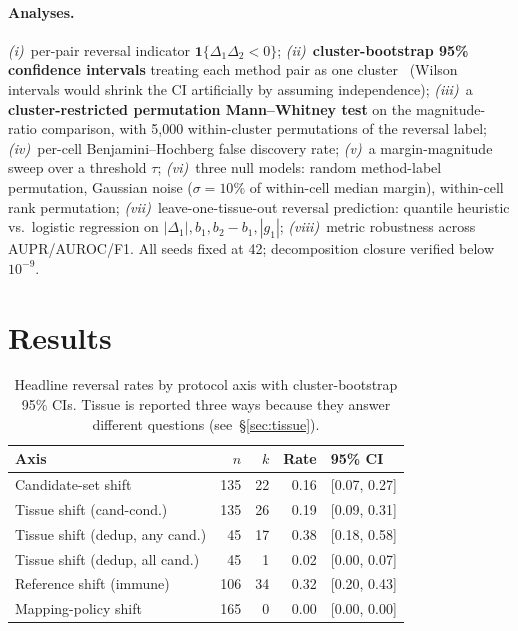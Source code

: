 \documentclass[sigconf,anonymous]{acmart}
\begin{document}
\paragraph{Analyses.}
\emph{(i)}~per-pair reversal indicator $\mathbf{1}\{\Delta_1\Delta_2 < 0\}$;
\emph{(ii)}~\textbf{cluster-bootstrap 95\% confidence intervals} treating
each method pair as one cluster~\cite{cameron2015} (Wilson intervals would
shrink the CI artificially by assuming independence);
\emph{(iii)}~a \textbf{cluster-restricted permutation Mann--Whitney test}
on the magnitude-ratio comparison, with 5{,}000 within-cluster
permutations of the reversal label;
\emph{(iv)}~per-cell Benjamini--Hochberg false discovery rate;
\emph{(v)}~a margin-magnitude sweep over a threshold $\tau$;
\emph{(vi)}~three null models: random method-label permutation, Gaussian
noise ($\sigma = 10\%$ of within-cell median margin), within-cell rank
permutation;
\emph{(vii)}~leave-one-tissue-out reversal prediction: quantile heuristic
vs.\ logistic regression on $|\Delta_1|, b_1, b_2{-}b_1, |g_1|$;
\emph{(viii)}~metric robustness across AUPR/AUROC/F1.
All seeds fixed at 42; decomposition closure verified below $10^{-9}$.

\section{Results}
\label{sec:results}

\begin{table}[t]
\centering
\caption{Headline reversal rates by protocol axis with cluster-bootstrap 95\% CIs.
Tissue is reported three ways because they answer different questions
(see~\S\ref{sec:tissue}).}
\label{tab:headline}
\small
\setlength{\tabcolsep}{4pt}
\begin{tabular}{lrrrl}
\toprule
Axis & $n$ & $k$ & Rate & 95\% CI \\
\midrule
Candidate-set shift            & 135 & 22 & 0.16 & [0.07, 0.27] \\
Tissue shift (cand-cond.)      & 135 & 26 & 0.19 & [0.09, 0.31] \\
Tissue shift (dedup, any cand.)&  45 & 17 & 0.38 & [0.18, 0.58] \\
Tissue shift (dedup, all cand.)&  45 &  1 & 0.02 & [0.00, 0.07] \\
Reference shift (immune)       & 106 & 34 & 0.32 & [0.20, 0.43] \\
Mapping-policy shift           & 165 &  0 & 0.00 & [0.00, 0.00] \\
\bottomrule
\end{tabular}
\end{table}
\end{document}
